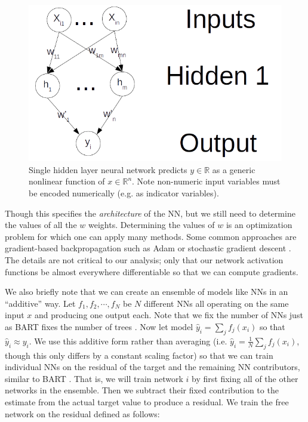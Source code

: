 \documentclass[12pt]{article}
\begin{document}
\begin{figure}[htb]
\centering
    \includegraphics[scale=1]{figs/nn.png}
    \caption{Single hidden layer neural network predicts $y \in \mathbb{R}$ as a generic nonlinear function of $x \in \mathbb{R}^n$.  Note non-numeric input variables must be encoded numerically (e.g. as indicator variables).}
    \label{fig:nn}
\end{figure}

Though this specifies the \emph{architecture} of the NN, but we still need to determine the values of all the $w$ weights.  Determining the values of $w$ is an optimization problem for which one can apply many methods.  Some common approaches are gradient-based backpropagation such as Adam \cite{kingma2014adam} or stochastic gradient descent \cite{hastie2009elements}.  The details are not critical to our analysis; only that our network activation functions be almost everywhere differentiable so that we can compute gradients.

We also briefly note that we can create an ensemble of models like NNs in an ``additive'' way.  Let $f_1, f_2, \cdots, f_N$ be $N$ different NNs all operating on the same input $x$ and producing one output each.  Note that we fix the number of NNs just as BART fixes the number of trees \cite{chipman2010bart}.  Now let model $\hat{y}_i = \sum_j f_j(x_i)$ so that $\hat{y}_i \approx y_i$.  We use this additive form rather than averaging (i.e. $\hat{y}_i = \frac{1}{N} \sum_j f_j(x_i)$, though this only differs by a constant scaling factor) so that we can train individual NNs on the residual of the target and the remaining NN contributors, similar to BART \cite{chipman2010bart}.  That is, we will train network $i$ by first fixing all of the other networks in the ensemble.  Then we subtract their fixed contribution to the estimate from the actual target value to produce a residual.  We train the free network on the residual defined as follows:
\end{document}
